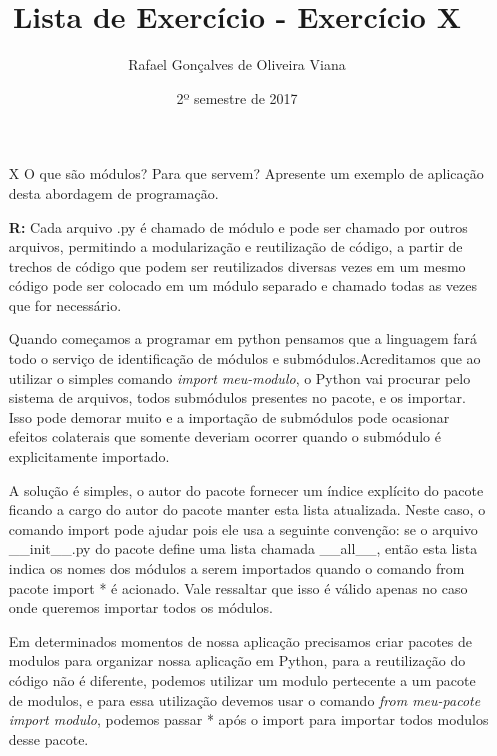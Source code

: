 \documentclass[12pt]{article}
\title{Lista de Exercício  - Exercício X }
\author{Rafael Gonçalves de  Oliveira Viana}
\date{2º semestre de 2017}
\begin{document}
\maketitle

\begin{enumerate}
\item[X]
O que são módulos? Para que servem? Apresente um exemplo de aplicação desta
abordagem de programação.

\textbf{R:}
Cada arquivo .py é chamado de módulo e pode ser chamado por outros arquivos, permitindo a modularização e reutilização de código, a partir de trechos de código que podem ser reutilizados diversas vezes em um mesmo código pode ser colocado em um módulo separado e chamado todas as vezes que for necessário.

Quando começamos a programar em python pensamos que a linguagem fará todo o serviço de identificação de módulos e submódulos.Acreditamos que ao utilizar o simples comando \textit{import meu-modulo}, o Python vai procurar pelo sistema de arquivos, todos submódulos presentes no pacote, e os importar. Isso pode demorar muito e a importação de submódulos pode ocasionar efeitos colaterais que somente deveriam ocorrer quando o submódulo é explicitamente importado.

A solução é simples, o autor do pacote fornecer um índice explícito do pacote ficando a cargo do autor do pacote manter esta lista atualizada. Neste caso, o comando import pode ajudar pois ele usa a seguinte convenção: se o arquivo \_\_init\_\_.py do pacote define uma lista chamada \_\_all\_\_, então esta lista indica os nomes dos módulos a serem importados quando o comando from pacote import * é acionado. Vale ressaltar que isso é válido apenas no caso onde queremos importar todos os módulos.

Em determinados momentos de nossa aplicação precisamos criar pacotes de modulos para organizar nossa aplicação em Python, para a reutilização do código não é diferente, podemos utilizar um modulo pertecente a um pacote de modulos, e para essa utilização devemos usar o comando \textit{from meu-pacote import modulo}, podemos passar * após o import para importar todos modulos desse pacote.


\inputminted{python}{Exemplo-9/App.py}


\end{enumerate}
\end{document}
